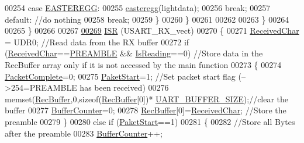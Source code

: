 \begin{DoxyCode}
{00254                 \textcolor{keywordflow}{case} \hyperlink{_led_effects_8h_a5645ec20d3cd39bfc1c9ad5ec99db2f2}{EASTEREGG}:
00255                     \hyperlink{_led_effects_8c_a25e09bcb1481b20ebc2a27e7098b5115}{easteregg}(lightdata);
00256                     \textcolor{keywordflow}{break};
00257                 \textcolor{keywordflow}{default}:    \textcolor{comment}{//do nothing}
00258                     \textcolor{keywordflow}{break};
00259             \}
00260         \}
00261         
00262         
00263     \}
00264       
00265 \}
00266 
00267 
\hypertarget{ws2811lichterkette_8c_source_l00269}{}\hyperlink{ws2811lichterkette_8c_a09ce999e15ad60b8a3f07d08af1946f9}{00269} \hyperlink{ws2811lichterkette_8c_a09ce999e15ad60b8a3f07d08af1946f9}{ISR} (USART\_RX\_vect)
00270 \{
00271     \hyperlink{globals_8h_ab5490074aaca289e986e9a00e0c25663}{ReceivedChar} = UDR0;                            \textcolor{comment}{//Read data from the RX buffer     }
00272     \textcolor{keywordflow}{if} (\hyperlink{globals_8h_ab5490074aaca289e986e9a00e0c25663}{ReceivedChar}==\hyperlink{ws2811lichterkette_8c_a8aac8c5098aaf915463fb31715efa09f}{PREAMBLE} && \hyperlink{globals_8h_a922ad5baed647eca43ad1a979e162ebd}{IsReading}==0)        \textcolor{comment}{//Store data in the
       RecBuffer array only if it is not accessed by the main function}
00273     \{
00274         \hyperlink{globals_8h_a1b09d1a5bcf4c8ab435bb3c9e36def59}{PacketComplete}=0;
00275         \hyperlink{globals_8h_aaa3bddd2273257ac5ec259197b62e984}{PaketStart}=1;                             \textcolor{comment}{//Set packet start flag (-->254=PREAMBLE has
       been received)}
00276         memset(\hyperlink{globals_8h_a5d735865707e6694a8173d629e0b4d5c}{RecBuffer},0,\textcolor{keyword}{sizeof}(\hyperlink{globals_8h_a5d735865707e6694a8173d629e0b4d5c}{RecBuffer}[0])*
      \hyperlink{globals_8h_a0d57378e32bf8278011460740bc29f7f}{UART\_BUFFER\_SIZE});\textcolor{comment}{//clear the buffer    }
00277         \hyperlink{globals_8h_aa6fcb4d4fca4554ac73bef10668c23cd}{BufferCounter}=0;
00278         \hyperlink{globals_8h_a5d735865707e6694a8173d629e0b4d5c}{RecBuffer}[0]=\hyperlink{globals_8h_ab5490074aaca289e986e9a00e0c25663}{ReceivedChar};                 \textcolor{comment}{//Store the preamble}
00279     \}
00280     \textcolor{keywordflow}{else} \textcolor{keywordflow}{if} (\hyperlink{globals_8h_aaa3bddd2273257ac5ec259197b62e984}{PaketStart}==1)
00281     \{
00282         \textcolor{comment}{//Store all Bytes after the preamble}
00283         \hyperlink{globals_8h_aa6fcb4d4fca4554ac73bef10668c23cd}{BufferCounter}++;    
}
\end{DoxyCode}
